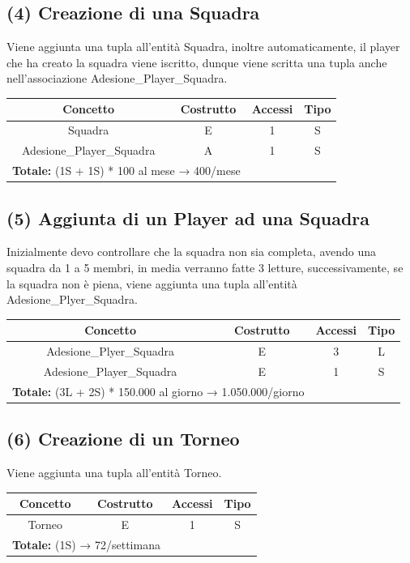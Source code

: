 \documentclass[a4paper,12pt]{report}
\begin{document}
\subsection*{(4) Creazione di una Squadra}
Viene aggiunta una tupla all'entità Squadra, inoltre automaticamente, il player che ha creato la squadra viene iscritto, dunque viene scritta una tupla anche nell'associazione Adesione\_Player\_Squadra.
\begin{center}
	\begin{tabular}{|c|c|c|c|}
		\hline\rowcolor{pink}
		Concetto & Costrutto & Accessi & Tipo\\
		\hline
		Squadra & E & 1 & S\\
		\hline
		Adesione\_Player\_Squadra & A & 1 & S\\
		\hline\hline
		\multicolumn{2}{l}{%
			\textbf{Totale:} (1S + 1S) * 100 al mese  → 400/mese} \\
		\hline\hline
	\end{tabular}
\end{center}
\subsection*{(5) Aggiunta di un Player ad una Squadra}
Inizialmente devo controllare che la squadra non sia completa, avendo una squadra da 1 a 5 membri, in media verranno fatte 3 letture, successivamente, se la squadra non è piena, viene aggiunta una tupla all'entità Adesione\_Plyer\_Squadra.
\begin{center}
	\begin{tabular}{|c|c|c|c|}
		\hline\rowcolor{pink}
		Concetto & Costrutto & Accessi & Tipo\\
		\hline\hline		
		Adesione\_Plyer\_Squadra & E & 3 & L\\
		Adesione\_Player\_Squadra & E & 1 & S\\
		\hline
		\hline
		\multicolumn{2}{l}{%
			\textbf{Totale:} (3L + 2S) * 150.000 al giorno → 1.050.000/giorno} \\
		\hline
	\end{tabular}
\end{center}
\subsection*{(6) Creazione di un Torneo}
Viene aggiunta una tupla all'entità Torneo.
\begin{center}
	\begin{tabular}{|c|c|c|c|}
		\hline\rowcolor{pink}
		Concetto & Costrutto & Accessi & Tipo\\
		\hline\hline		
		Torneo & E & 1 & S\\
		\hline
		\hline
		\multicolumn{2}{l}{%
			\textbf{Totale:} (1S) → 72/settimana} \\
		\hline
	\end{tabular}
\end{center}
\end{document}
